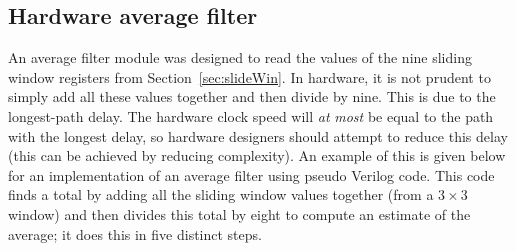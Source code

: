 \documentclass[10pt,twocolumn,letterpaper]{article}
\begin{document}
\subsection{Hardware average filter}
\label{sec:av}
An average filter module was designed to read the values of the nine sliding window registers from Section~\ref{sec:slideWin}.
In hardware, it is not prudent to simply add all these values together and then divide by nine. This is due to the longest-path delay.
The hardware clock speed will \emph{at} \emph{most} be equal to the path with the longest delay, so hardware designers should
attempt to reduce this delay (this can be achieved by reducing complexity). An example of this is given
below for an implementation of an average filter using pseudo Verilog code. This code finds a total by adding 
all the sliding window values
together (from a $3\times3$ window) and then divides this total by eight to compute an estimate of the average; 
it does this in five distinct steps.
\end{document}
